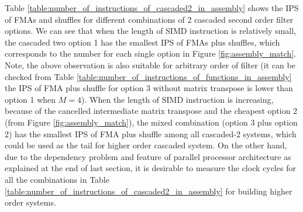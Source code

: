 Table \ref{table:number_of_instructions_of_cascaded2_in_assembly} shows the IPS of FMAs and shuffles
for different combinations of 2 cascaded second order filter options.
We can see that when the length of SIMD instruction is relatively small,
the cascaded two option 1 has the smallest IPS of FMAs plus shuffles, which corresponds to
the number for each single option in Figure \ref{fig:assembly_match}.
Note, the above observation is also suitable for arbitrary order of filter
(it can be checked from Table
\ref{table:number_of_instructions_of_functions_in_assembly} 
the IPS of FMA plus shuffle for option 3 without matrix 
transpose is lower than option 1 when $M{=}4$).
When the length of SIMD instruction is increasing,
because of the cancelled intermediate matrix transpose
and the cheapest option 2 (from Figure \ref{fig:assembly_match}),
the mixed combination (option 3 plus option 2)
has the smallest IPS of FMA plus shuffle among all cascaded-2 systems,
which could be used as the tail for higher order cascaded system. 
On the other hand,  
due to the dependency problem and
feature of parallel processor architecture 
as explained at the end of last section,
it is desirable to measure the clock cycles for all the combinations in Table \ref{table:number_of_instructions_of_cascaded2_in_assembly}
for building higher order systems. 


